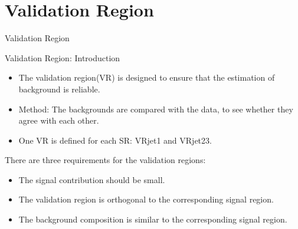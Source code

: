 \documentclass[mathserif,serif]{beamer}
\begin{document}
\section{Validation Region}
\begin{frame}
\begin{center}
\huge
Validation Region
\end{center}
\end{frame}

\begin{frame}{Validation Region: Introduction}
\begin{itemize}
\item The validation region(VR) is designed to ensure that the estimation of background is reliable.
\item Method: The backgrounds are compared with the data, to see whether they agree with each other.
\item One VR is defined for each SR: VRjet1 and VRjet23.
\end{itemize}
There are three requirements for the validation regions:
\begin{itemize}
\item The signal contribution should be small.
\item The validation region is orthogonal to the corresponding signal region.
\item The background composition is similar to the corresponding signal region.
\end{itemize}
\end{frame}
\end{document}
